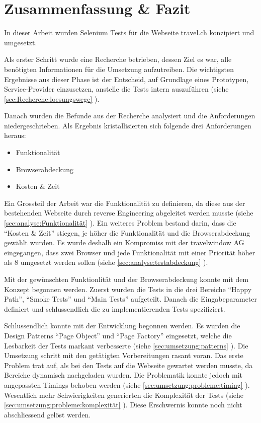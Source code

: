 
\chapter{Zusammenfassung \& Fazit}
In dieser Arbeit wurden Selenium Tests für die Webseite travel.ch konzipiert und umgesetzt. 

Als erster Schritt wurde eine Recherche betrieben, dessen Ziel es war, alle benötigten Informationen für die Umsetzung aufzutreiben. Die wichtigsten Ergebnisse aus dieser Phase ist der Entscheid, auf Grundlage eines Prototypen, Service-Provider einzusetzen, anstelle die Tests intern auszuführen (siehe \cref{sec:Recherche:loesungswege} ). 

Danach wurden die Befunde aus der Recherche analysiert und die Anforderungen niedergeschrieben. Als Ergebnis kristallisierten sich folgende drei Anforderungen heraus:
\begin{itemize}
\item Funktionalität
\item Browserabdeckung
\item Kosten \& Zeit
\end{itemize}
Ein Grossteil der Arbeit war die Funktionalität zu definieren, da diese aus der bestehenden Webseite durch reverse Engineering abgeleitet werden musste (siehe \cref{sec:analyse:Funktionalität} ). Ein weiteres Problem bestand darin, dass die "`Kosten \& Zeit"' stiegen, je höher die Funktionalität und die Browserabdeckung gewählt wurden. Es wurde deshalb ein Kompromiss mit der travelwindow AG eingegangen, dass zwei Browser und jede Funktionalität mit einer Priorität höher als 8 umgesetzt werden sollen (siehe  \cref{sec:analyse:testabdeckung} ).

Mit der gewünschten Funktionlität und der Browserabdeckung konnte mit dem Konzept begonnen werden. Zuerst wurden die Tests in die drei Bereiche "`Happy Path"', "`Smoke Tests"' und "`Main Tests"' aufgeteilt. Danach die Eingabeparameter definiert und schlussendlich die zu implementierenden Tests spezifiziert.

Schlussendlich konnte mit der Entwicklung begonnen werden. Es wurden die Design Patterns "`Page Object"' und "`Page Factory"' eingesetzt, welche die Lesbarkeit der Tests markant verbesserte (siehe \cref{sec:umsetzung:patterns} ). Die Umsetzung schritt mit den getätigten Vorbereitungen rasant voran. Das erste Problem trat auf, als bei den Tests auf die Webseite gewartet werden musste, da Bereiche dynamisch nachgeladen wurden. Die Problematik konnte jedoch mit angepassten Timings behoben werden (siehe \cref{sec:umsetzung:probleme:timing} ). Wesentlich mehr Schwierigkeiten generierten die Komplexität der Tests (siehe \cref{sec:umsetzung:probleme:komplexität} ). Diese Erschwernis konnte noch nicht abschliessend gelöst werden.

